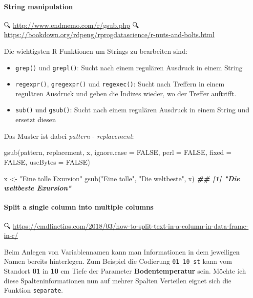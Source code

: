 \documentclass[
]{article}
\newenvironment{Shaded}{\begin{snugshade}}{\end{snugshade}}
\newcommand{\DocumentationTok}[1]{\textcolor[rgb]{0.56,0.35,0.01}{\textbf{\textit{#1}}}}
\newcommand{\FunctionTok}[1]{\textcolor[rgb]{0.00,0.00,0.00}{#1}}
\newcommand{\NormalTok}[1]{#1}
\newcommand{\OtherTok}[1]{\textcolor[rgb]{0.56,0.35,0.01}{#1}}
\newcommand{\StringTok}[1]{\textcolor[rgb]{0.31,0.60,0.02}{#1}}
\providecommand{\tightlist}{%
  \setlength{\itemsep}{0pt}\setlength{\parskip}{0pt}}
\begin{document}
\hypertarget{string-manipulation}{%
\paragraph{String manipulation}\label{string-manipulation}}

🔍 \url{http://www.endmemo.com/r/gsub.php}
🔍 \url{https://bookdown.org/rdpeng/rprogdatascience/r-nuts-and-bolts.html}

Die wichtigsten R Funktionen um Strings zu bearbeiten sind:

\begin{itemize}
\tightlist
\item
  \texttt{grep()} und \texttt{grepl()}: Sucht nach einem regulären Ausdruck in einem String
\item
  \texttt{regexpr()}, \texttt{gregexpr()} und \texttt{regexec()}: Sucht nach Treffern in einem regulären Ausdruck und geben die Indizes wieder, wo der Treffer auftrifft.
\item
  \texttt{sub()} und \texttt{gsub()}: Sucht nach einem regulären Ausdruck in einem String und ersetzt diesen
\end{itemize}

Das Muster ist dabei \emph{pattern} - \emph{replacement}:

gsub(pattern, replacement, x, ignore.case = FALSE, perl = FALSE, fixed = FALSE, useBytes = FALSE)

\begin{Shaded}
\begin{Highlighting}[]
\NormalTok{x }\OtherTok{\textless{}{-}} \StringTok{"Eine tolle Exursion"}
\FunctionTok{gsub}\NormalTok{(}\StringTok{"Eine tolle"}\NormalTok{, }\StringTok{"Die weltbeste"}\NormalTok{, x)}
\DocumentationTok{\#\# [1] "Die weltbeste Exursion"}
\end{Highlighting}
\end{Shaded}

\hypertarget{split-a-single-column-into-multiple-columns}{%
\paragraph{Split a single column into multiple columns}\label{split-a-single-column-into-multiple-columns}}

🔍 \url{https://cmdlinetips.com/2018/03/how-to-split-text-in-a-column-in-data-frame-in-r/}

Beim Anlegen von Variablennamen kann man Informationen in dem jeweiligen Namen bereits hinterlegen. Zum Beispiel die Codierung \texttt{01\_10\_st} kann vom Standort \textbf{01} in \textbf{10} cm Tiefe der Parameter \textbf{Bodentemperatur} sein. Möchte ich diese Spalteninformationen nun auf mehrer Spalten Verteilen eignet sich die Funktion \texttt{separate}.
\end{document}
